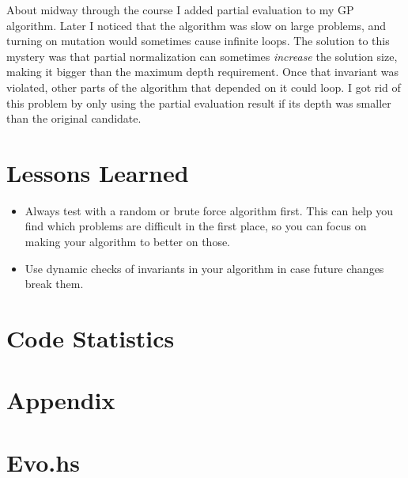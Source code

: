 \documentclass{article}
\begin{document}
About midway through the course I added partial evaluation to my GP
algorithm. Later I noticed that the algorithm was slow on large
problems, and turning on mutation would sometimes cause infinite
loops. The solution to this mystery was that partial normalization can
sometimes \textit{increase} the solution size, making it bigger than
the maximum depth requirement. Once that invariant was violated, other
parts of the algorithm that depended on it could loop. I got rid of
this problem by only using the partial evaluation result if its depth
was smaller than the original candidate.

\section{Lessons Learned}

\begin{itemize}
\item Always test with a random or brute force algorithm first. This can
help you find which problems are difficult in the first place, so you
can focus on making your algorithm to better on those.
\item Use dynamic checks of invariants in your algorithm in case future
changes break them.
\end{itemize}

\section{Code Statistics}

\section*{Appendix}
\appendix

\section{Evo.hs}
\end{document}
